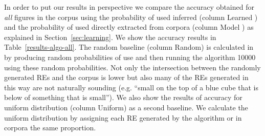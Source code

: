 In order to put our results in perspective we compare the accuracy obtained for \textit{all} figures in the corpus using the probability of used inferred (column Learned \puse) and the probability of used directly extracted from corpora (column Model \puse) as explained in Section~\ref{sec:learning}. We show the accuracy results in Table~\ref{results-algo-all}. The random baseline (column Random) is calculated in by producing random probabilities of use and then running the algorithm 10000 using these random probabilities. Not only the intersection between the randomly generated REs and the corpus is lower but also many of  the REs generated in this way are not naturally sounding (e.g. ``small on the top of a blue cube that is below of something that is small''). We also show the results of accuracy for uniform distribution (column Uniform) as a second baseline. We calculate the uniform distribution by assigning each RE generated by the algorithm or in corpora the same proportion. 

